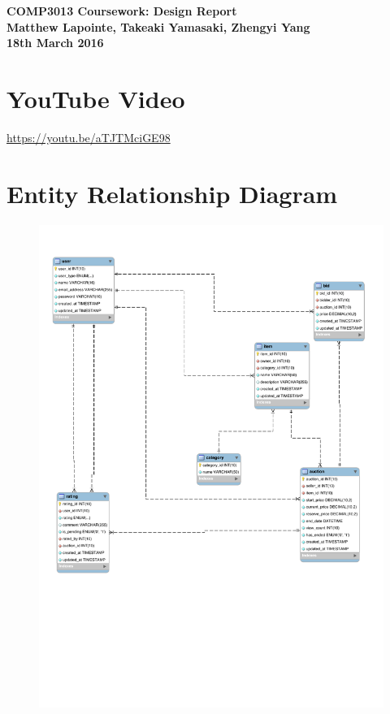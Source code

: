\documentclass{article}
\begin{document}
\begin{center}
{\LARGE\bf COMP3013 Coursework: Design Report}\\
\vspace{2mm}
{\bf Matthew Lapointe, Takeaki Yamasaki, Zhengyi Yang}\\
\vspace{1mm}
\textbf{18th March 2016}
\end{center}

\section{YouTube Video}

\url{https://youtu.be/aTJTMciGE98}

\section{Entity Relationship Diagram}

\begin{figure}[!h]
\begin{center}
\includegraphics[scale=.65]{ERDiagram.pdf}
\end{center}
\end{figure}
\end{document}
